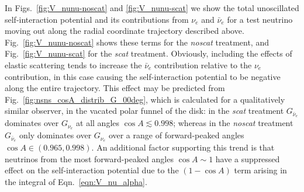 \documentclass[aps,floatfix,prd,superscriptaddress,twocolumn]{revtex4-1}
\begin{document}
In Figs.~\ref{fig:V_nunu-noscat} and \ref{fig:V_nunu-scat}
we show the total unoscillated self-interaction potential
and its contributions from $\nu_e$ and $\bar{\nu}_e$ for a test neutrino
moving out along the radial coordinate trajectory described above.
Fig.~\ref{fig:V_nunu-noscat} shows these terms for the \emph{noscat} treatment,
and Fig.~\ref{fig:V_nunu-scat} for the \emph{scat} treatment.
Obviously, including the effects of elastic scattering tends to increase the
$\bar{\nu}_e$ contribution relative to the $\nu_e$ contribution,
in this case causing the self-interaction potential to be negative
along the entire trajectory.
This effect may be predicted from Fig.~\ref{fig:nsns_cosA_distrib_G_00deg},
which is calculated for a qualitatively similar observer, in the vacated polar
funnel of the disk:
in the \emph{scat} treatment $G_{\bar{\nu}_e}$ dominates over $G_{\nu_e}$ at
all angles $\cos A \lesssim 0.998$;
whereas in the \emph{noscat} treatment $G_{\bar{\nu}_e}$ only dominates over
$G_{\nu_e}$ over a range of forward-peaked angles $\cos A \in (0.965,0.998)$.
An additional factor supporting this trend is that neutrinos from the most
forward-peaked angles $\cos A \sim 1$ have a suppressed effect on the
self-interaction potential due to the $(1-\cos A)$ term arising in the integral
of Eqn.~\ref{eqn:V_nu_alpha}.
\end{document}
